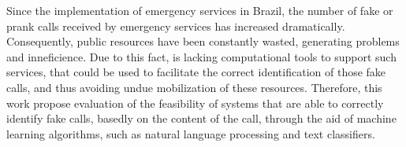 Since the implementation of emergency services in Brazil, the number of fake or prank calls received by emergency services has increased dramatically. Consequently, public resources have been constantly wasted, generating problems and inneficience. Due to this fact, is lacking computational tools to support such services, that could be used to facilitate the correct identification of those fake calls, and thus avoiding undue mobilization of these resources. Therefore, this work propose evaluation of the feasibility of systems that are able to correctly identify fake calls, basedly on the content of the call, through the aid of machine learning algorithms, such as natural language processing and text classifiers.

